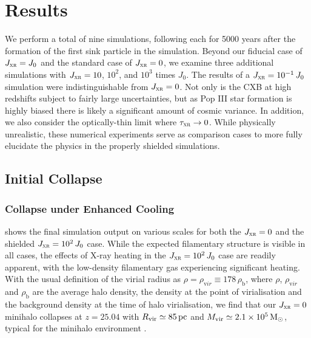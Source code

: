 \documentclass[../thesis.tex]{subfiles}
\begin{document}
\section{Results}
\label{results}
We perform a total of nine simulations, following each for 5000 years after the formation of the first sink particle in the simulation.  Beyond our fiducial case of $J_{\textsc{xr}}=J_0$ and the standard case of $J_{\textsc{xr}}=0$, we examine three additional  simulations with $J_{\textsc{xr}} = 10$, $10^2$, and $10^3$ times $J_0$. The results of a $J_{\textsc{xr}} = 10^{-1}\,J_0$ simulation were indistinguishable from $J_{\textsc{xr}}=0$. Not only is the CXB at high redshifts subject to fairly large uncertainties, but as Pop III star formation is highly biased there is likely a significant amount of cosmic variance.
In addition, we also consider the optically-thin limit where $\tau_{\textsc{xr}} \rightarrow 0$.  While physically unrealistic, these numerical experiments serve as comparison cases to more fully elucidate the physics in the properly shielded simulations.

\subsection{Initial Collapse}
\label{collapse}
\subsubsection{Collapse under Enhanced Cooling}
\label{collapse_acceleration}
 shows the final simulation output on various scales for both the $J_{\textsc{xr}}=0$ and the shielded $J_{\textsc{xr}} = 10^2\,J_0$ case.  While the expected filamentary structure is visible in all cases, the effects of X-ray heating in the  $J_{\textsc{xr}} = 10^2\,J_0$ case are readily apparent, with the low-density filamentary gas  
experiencing significant heating. With the usual definition of the virial radius \rvir as $\rho = \rho_{\mathrm vir} \equiv 178\,\rho_{\mathrm b}$, where $\rho$, $\rho_{\mathrm vir}$ and $\rho_{\mathrm b}$ are the average halo density, the density at the point of virialisation and the background density at the time of halo virialisation, we find that our $J_{\textsc{xr}} = 0$ minihalo collapses at $z=25.04$ with ${R}_{\mathrm{vir}} \simeq 85\,\mathrm{pc}$ and ${M}_{\mathrm{vir}} \simeq 2.1\times10^5\,\mathrm{M}_{\odot}$, typical for the minihalo environment \citep{Bromm2013}.  
\end{document}
